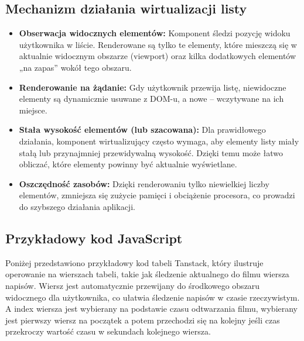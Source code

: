 \subsection*{Mechanizm działania wirtualizacji listy}
\begin{itemize}
    \item \textbf{Obserwacja widocznych elementów:} Komponent śledzi pozycję widoku użytkownika w liście. Renderowane są tylko te elementy, które mieszczą się w aktualnie widocznym obszarze (viewport) oraz kilka dodatkowych elementów „na zapas” wokół tego obszaru.
    \item \textbf{Renderowanie na żądanie:} Gdy użytkownik przewija listę, niewidoczne elementy są dynamicznie usuwane z DOM-u, a nowe – wczytywane na ich miejsce.
    \item \textbf{Stała wysokość elementów (lub szacowana):} Dla prawidłowego działania, komponent wirtualizujący często wymaga, aby elementy listy miały stałą lub przynajmniej przewidywalną wysokość. Dzięki temu może łatwo obliczać, które elementy powinny być aktualnie wyświetlane.
    \item \textbf{Oszczędność zasobów:} Dzięki renderowaniu tylko niewielkiej liczby elementów, zmniejsza się zużycie pamięci i obciążenie procesora, co prowadzi do szybszego działania aplikacji.
\end{itemize}
\subsection*{Przykładowy kod JavaScript}
Poniżej przedstawiono przykładowy kod tabeli Tanstack, który ilustruje operowanie na wierszach tabeli, takie jak śledzenie aktualnego do filmu wiersza napisów. Wiersz jest automatycznie przewijany do środkowego obszaru widocznego dla użytkownika, co ułatwia śledzenie napisów w czasie rzeczywistym. A index wiersza jest wybierany na podstawie czasu odtwarzania filmu, wybierany jest pierwszy wiersz na początek a potem przechodzi się na kolejny jeśli czas przekroczy wartość czasu w sekundach kolejnego wiersza.

